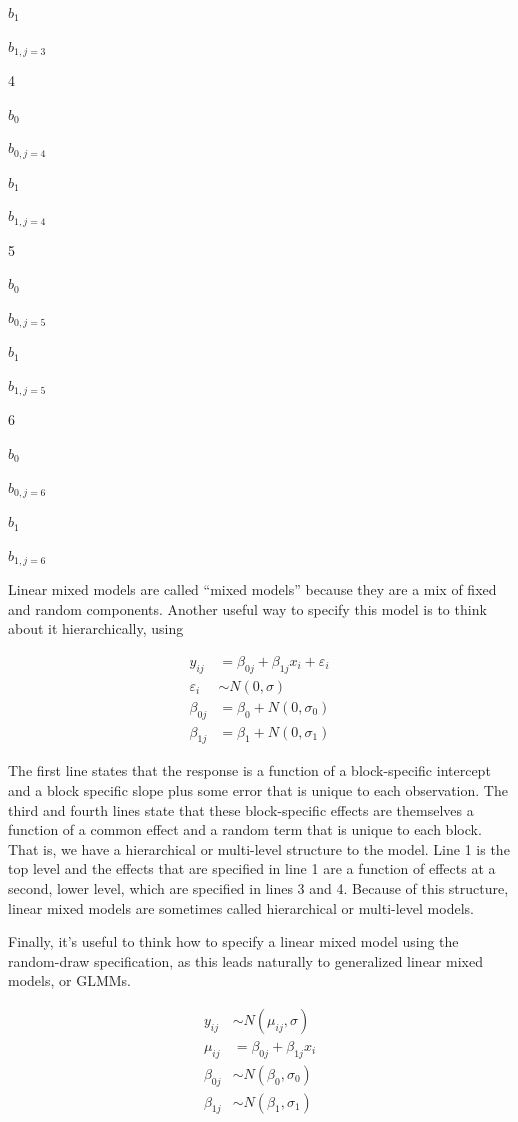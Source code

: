 \documentclass[]{book}
\begin{document}
\(b_1\)

\(b_{1,j=3}\)

4

\(b_0\)

\(b_{0,j=4}\)

\(b_1\)

\(b_{1,j=4}\)

5

\(b_0\)

\(b_{0,j=5}\)

\(b_1\)

\(b_{1,j=5}\)

6

\(b_0\)

\(b_{0,j=6}\)

\(b_1\)

\(b_{1,j=6}\)

Linear mixed models are called ``mixed models'' because they are a mix
of fixed and random components. Another useful way to specify this model
is to think about it hierarchically, using

\begin{align}
y_{ij} &= \beta_{0j} + \beta_{1j}x_i + \varepsilon_i \\
\varepsilon_i &\sim N(0, \sigma) \\
\beta_{0j} &= \beta_{0} + N(0, \sigma_{0}) \\
\beta_{1j} &= \beta_{1} + N(0, \sigma_{1})
\label{eq:lmm-spec2}
\end{align}

The first line states that the response is a function of a
block-specific intercept and a block specific slope plus some error that
is unique to each observation. The third and fourth lines state that
these block-specific effects are themselves a function of a common
effect and a random term that is unique to each block. That is, we have
a hierarchical or multi-level structure to the model. Line 1 is the top
level and the effects that are specified in line 1 are a function of
effects at a second, lower level, which are specified in lines 3 and 4.
Because of this structure, linear mixed models are sometimes called
hierarchical or multi-level models.

Finally, it's useful to think how to specify a linear mixed model using
the random-draw specification, as this leads naturally to generalized
linear mixed models, or GLMMs.

\begin{align}
y_{ij} &\sim N(\mu_{ij}, \sigma) \\
\mu_{ij} &=\beta_{0j} + \beta_{1j}x_i \\
\beta_{0j} &\sim N(\beta_0, \sigma_0) \\
\beta_{1j} &\sim N(\beta_1, \sigma_1)
\label{eq:lmm-spec3}
\end{align}
\end{document}
